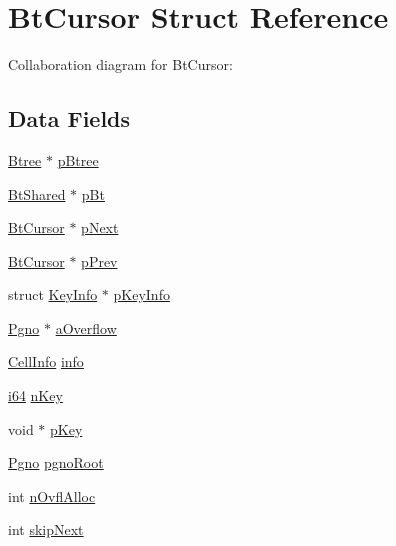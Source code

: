 \hypertarget{struct_bt_cursor}{}\section{Bt\+Cursor Struct Reference}
\label{struct_bt_cursor}


Collaboration diagram for Bt\+Cursor\+:
\subsection*{Data Fields}
\begin{DoxyCompactItemize}
\item 
\hyperlink{struct_btree}{Btree} $\ast$ \hyperlink{struct_bt_cursor_a8bc098d3190d7b0458b0f00fc3e9841b}{p\+Btree}
\item 
\hyperlink{struct_bt_shared}{Bt\+Shared} $\ast$ \hyperlink{struct_bt_cursor_a2bc66d19c064bb25ff335241f8c621df}{p\+Bt}
\item 
\hyperlink{struct_bt_cursor}{Bt\+Cursor} $\ast$ \hyperlink{struct_bt_cursor_a1dac2396746176f48a6d2eebfc765c17}{p\+Next}
\item 
\hyperlink{struct_bt_cursor}{Bt\+Cursor} $\ast$ \hyperlink{struct_bt_cursor_a28e43147b02ff3745de0afb619d64c25}{p\+Prev}
\item 
struct \hyperlink{struct_key_info}{Key\+Info} $\ast$ \hyperlink{struct_bt_cursor_a0c73f46f09fcecfd9c8d29cd3cc7744d}{p\+Key\+Info}
\item 
\hyperlink{sqlite3_8c_aec0c653e8dd16e4639caf2f8ea54f55c}{Pgno} $\ast$ \hyperlink{struct_bt_cursor_a7deae3222686e7a2ef3247ee13dc5323}{a\+Overflow}
\item 
\hyperlink{struct_cell_info}{Cell\+Info} \hyperlink{struct_bt_cursor_ab84854bed31add78eccfc236e2d3895e}{info}
\item 
\hyperlink{sqlite3_8c_a2a0f0f4ae7001eb54351f77ea1cdbcfd}{i64} \hyperlink{struct_bt_cursor_a528c39e09f68386edd6e2fbb64784561}{n\+Key}
\item 
void $\ast$ \hyperlink{struct_bt_cursor_af4e0ec7c9494e9d87e0042ab054ac58b}{p\+Key}
\item 
\hyperlink{sqlite3_8c_aec0c653e8dd16e4639caf2f8ea54f55c}{Pgno} \hyperlink{struct_bt_cursor_a30f00f9ff785feab4d71f2cf58faab84}{pgno\+Root}
\item 
int \hyperlink{struct_bt_cursor_acf0ab682d2f00d7bfea7e4e35dba7fc9}{n\+Ovfl\+Alloc}
\item 
int \hyperlink{struct_bt_cursor_ad37941f0529357971cb490f54966185b}{skip\+Next}
\item 

\end{DoxyCompactItemize}
